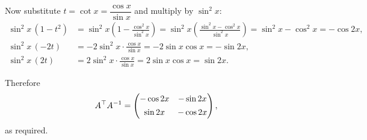 \documentclass[12pt]{article}
\begin{document}
Now substitute \(t=\cot x=\dfrac{\cos x}{\sin x}\) and multiply by \(\sin^2 x\):
\begin{align}
\sin^2 x\,(1-t^2)
&= \sin^2 x\!\left(1-\frac{\cos^2 x}{\sin^2 x}\right)
= \sin^2 x\!\left(\frac{\sin^2 x-\cos^2 x}{\sin^2 x}\right)
= \sin^2 x - \cos^2 x
= -\cos 2x, \\
\sin^2 x\,(-2t)
&= -2\sin^2 x\cdot\frac{\cos x}{\sin x}
= -2\sin x\cos x
= -\sin 2x, \\
\sin^2 x\,(2t)
&= 2\sin^2 x\cdot\frac{\cos x}{\sin x}
= 2\sin x\cos x
= \sin 2x.
\end{align}

Therefore
\begin{equation}
A^{\top}A^{-1}
= \begin{pmatrix}-\cos 2x & -\sin 2x \\[4pt] \sin 2x & -\cos 2x\end{pmatrix},
\end{equation}
as required.
\end{document}
